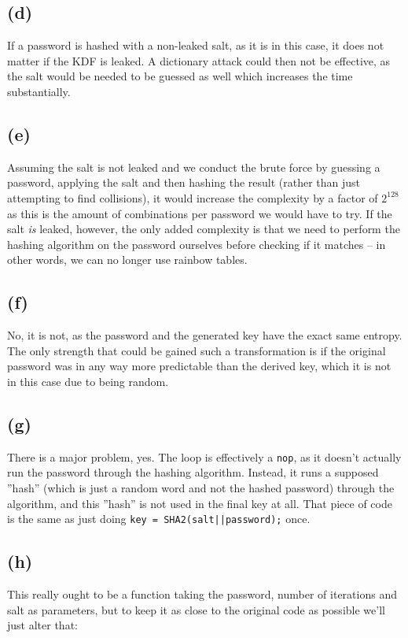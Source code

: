 \documentclass{article}
\begin{document}
\subsection*{(d)}

If a password is hashed with a non-leaked salt, as it is in this case, it does not matter if the KDF is leaked.
A dictionary attack could then not be effective, as the salt would be needed to be guessed as well which increases the time substantially.

\subsection*{(e)}

Assuming the salt is not leaked and we conduct the brute force by guessing a password, applying the salt and then hashing the result (rather than just attempting to find collisions), it would increase the complexity by a factor of $2^{128}$ as this is the amount of combinations per password we would have to try.
If the salt \textit{is} leaked, however, the only added complexity is that we need to perform the hashing algorithm on the password ourselves before checking if it matches -- in other words, we can no longer use rainbow tables.

\subsection*{(f)}

No, it is not, as the password and the generated key have the exact same entropy. The only strength that could be gained such a transformation is if the original password was in any way more predictable than the derived key, which it is not in this case due to being random.

\subsection*{(g)}

There is a major problem, yes. The loop is effectively a \verb|nop|, as it doesn't actually run the password through the hashing algorithm. Instead, it runs a supposed ''hash'' (which is just a random word and not the hashed password) through the algorithm, and this ''hash'' is not used in the final key at all. That piece of code is the same as just doing \verb#key = SHA2(salt||password);# once.

\subsection*{(h)}
This really ought to be a function taking the password, number of iterations and salt as parameters, but to keep it as close to the original code as possible we'll just alter that:
\end{document}
